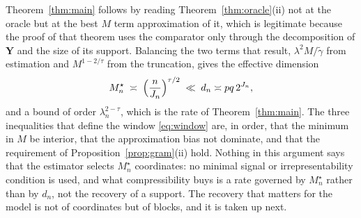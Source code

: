 \documentclass[12pt]{article} %
\theoremstyle{definition}
\newcommand{\pen}{\lambda}
\newcommand{\penn}{\lambda_{n}}
\newcommand{\bY}{\mathbf{Y}}
\newcommand{\gtil}{\widetilde{\gamma}}
\newcommand{\Mstar}{M^{\star}}
\begin{document}
Theorem~\ref{thm:main} follows by reading Theorem~\ref{thm:oracle}(ii) not at
the oracle but at the best $M$ term approximation of it, which is legitimate
because the proof of that theorem uses the comparator only through the
decomposition of $\bY$ and the size of its support. Balancing the two terms
that result, $\pen^{2}M/\gtil$ from estimation and
$M^{1-2/\tau}$ from the truncation, gives the effective dimension
\begin{equation}
  \label{eq:Mstar}
  \Mstar_n \;\asymp\; \Bigl(\frac{n}{J_n}\Bigr)^{\tau/2}
  \;\ll\; d_n \asymp pq\,2^{J_n},
\end{equation}
and a bound of order $\penn^{2-\tau}$, which is the rate of
Theorem~\ref{thm:main}. The three inequalities that define the window
\eqref{eq:window} are, in order, that the minimum in $M$ be interior, that the
\textcolor{colR1}{approximation bias} not dominate, and that the requirement of
Proposition~\ref{prop:gram}(ii) hold. Nothing in this argument says that the
estimator selects $\Mstar_n$ coordinates: no minimal signal or
irrepresentability condition is used, and what compressibility buys is a rate
governed by $\Mstar_n$ rather than by $d_n$, not the recovery of a support.
\textcolor{colR1}{The recovery that matters for the model is not of coordinates
but of blocks, and it is taken up next.}
\end{document}
